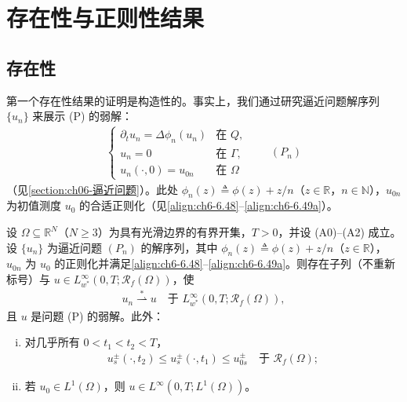 \documentclass[../../main.tex]{subfiles}%
\begin{document}
\section{存在性与正则性结果}\label{section:ch06-存在正则}
\subsection{存在性}\label{subsection:ch06-存在性}
第一个存在性结果的证明是构造性的。事实上，我们通过研究逼近问题解序列 $\{u_n\}$ 来展示 (P) 的弱解：
\begin{align*}
\begin{cases}
\partial_t u_n=\Delta\phi_n(u_n) & \text{在 }Q,\\
u_n=0 & \text{在 }\Gamma,\\
u_n(\cdot,0)=u_{0n} & \text{在 }\Omega
\end{cases}
\qquad(P_n)
\end{align*}
（见\cref{section:ch06-逼近问题}）。此处 $\phi_n(z)\triangleq\phi(z)+z/n$（$z\in\mathbb{R}$，$n\in\mathbb{N}$），$u_{0n}$ 为初值测度 $u_0$ 的合适正则化（见\eqref{align:ch6-6.48}--\eqref{align:ch6-6.49a}）。
\begin{theorem}\label{theorem:ch06-6.4.1}
设 $\Omega\subseteq\mathbb{R}^N$（$N\geqslant3$）为具有光滑边界的有界开集，$T>0$，并设 (A0)--(A2) 成立。设 $\{u_n\}$ 为逼近问题 $(P_n)$ 的解序列，其中 $\phi_n(z)\triangleq\phi(z)+z/n$（$z\in\mathbb{R}$），$u_{0n}$ 为 $u_0$ 的正则化并满足\eqref{align:ch6-6.48}--\eqref{align:ch6-6.49a}。则存在子列（不重新标号）与 $u\in L^\infty_{w^*}(0,T;\mathscr{R}_f(\Omega))$，使
\begin{align*}
u_n\stackrel{*}{\rightharpoonup}u \quad\text{于 }L^\infty_{w^*}(0,T;\mathscr{R}_f(\Omega)),
\end{align*}
且 $u$ 是问题 (P) 的弱解。此外：
\begin{enumerate}[(i)]
\item 对几乎所有 $0<t_1<t_2<T$，
\begin{align}
u^\pm_s(\cdot,t_2)\leqslant u^\pm_s(\cdot,t_1)\leqslant u^\pm_{0s} \quad\text{于 }\mathscr{R}_f(\Omega); \label{align:ch6-6.33}
\end{align}
\item 若 $u_0\in L^1(\Omega)$，则 $u\in L^\infty(0,T;L^1(\Omega))$。
\end{enumerate}
\end{theorem}
\end{document}
